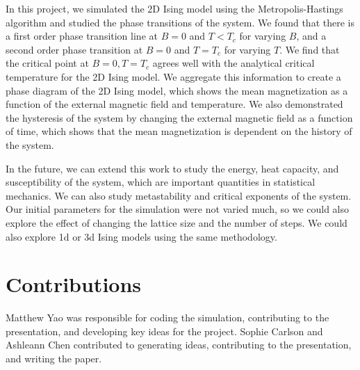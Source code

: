 \documentclass[
 reprint,
 amsmath,
 amssymb,
 aps,
]{revtex4-2}
\begin{document}
In this project, we simulated the 2D Ising model using the Metropolis-Hastings
algorithm and studied the phase transitions of the system.
We found that there is a first order phase transition line at $ B=0 $
and $ T < T_{c} $ for varying $ B $, and a second order phase transition
at $ B=0 $ and $ T = T_{c} $ for varying $ T $.
We find that the critical point at $ B = 0, T = T_{c} $ agrees well with
the analytical critical temperature for the 2D Ising model.
We aggregate this information to create a phase diagram of the 2D Ising model,
which shows the mean magnetization as a function of the external magnetic
field and temperature.
We also demonstrated the hysteresis of the system by changing the external
magnetic field as a function of time,
which shows that the mean magnetization is dependent on the history of the
system.

In the future, we can extend this work to study the energy,
heat capacity, and susceptibility of the system,
which are important quantities in statistical mechanics.
We can also study metastability and critical exponents of the system.
Our initial parameters for the simulation were not varied much,
so we could also explore the effect of changing the lattice size and 
the number of steps. We could also explore 1d or 3d Ising models using the 
same methodology.


\section{Contributions}

Matthew Yao was responsible for coding the simulation, contributing to the presentation, and developing key ideas for the project. Sophie Carlson and Ashleann Chen contributed to generating ideas, contributing to the presentation, and writing the paper.


\appendix
\end{document}
